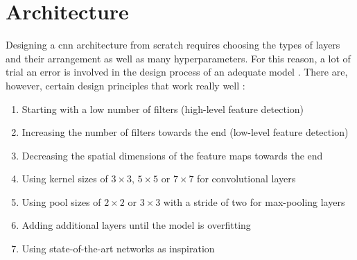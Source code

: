 \section{Architecture}
\label{sec:training_of_the_cnn:architecture}

Designing a \acrlong{cnn} architecture from scratch requires choosing the types of layers and their arrangement as well as many hyperparameters.
For this reason, a lot of trial an error is involved in the design process of an adequate model \cite{training_arch_design}.
There are, however, certain design principles that work really well \cite{training_arch_hyper}:

\begin{enumerate}
  \item Starting with a low number of filters (high-level feature detection)
  \item Increasing the number of filters towards the end (low-level feature detection)
  \item Decreasing the spatial dimensions of the feature maps towards the end
  \item Using kernel sizes of $3\times 3$, $5\times 5$ or $7\times 7$ for convolutional layers
  \item Using pool sizes of $2\times 2$ or $3\times 3$ with a stride of two for max-pooling layers
  \item Adding additional layers until the model is overfitting
  \item Using state-of-the-art networks as inspiration
\end{enumerate}

